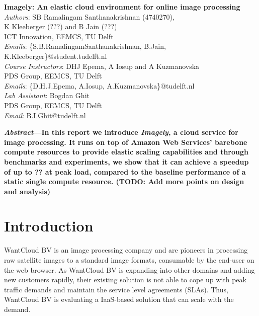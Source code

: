 \documentclass[a4paper]{IEEEtran}
\begin{document}

\begin{center}
  \textbf{\LARGE{
    Imagely: An elastic cloud environment for online image processing
  }}\\
  \vspace{0.25cm}
  \emph{Authors}: SB Ramalingam Santhanakrishnan (4740270), \\ K Kleeberger (???) and B Jain (???)\\
  ICT Innovation, EEMCS, TU Delft\\
  \emph{Emails}: \{S.B.RamalingamSanthanakrishnan, B.Jain, K.Kleeberger\}@student.tudelft.nl\\
  \vspace{0.2cm}
  \emph{Course Instructors}: DHJ Epema, A Iosup and A Kuzmanovska\\
  PDS Group, EEMCS, TU Delft\\
  \emph{Emails}: \{D.H.J.Epema, A.Iosup, A.Kuzmanovska\}@tudelft.nl\\
  \vspace{0.2cm}
  \emph{Lab Assistant}: Bogdan Ghit\\
  PDS Group, EEMCS, TU Delft\\
  \emph{Email}: B.I.Ghit@tudelft.nl\\
\end{center}

\vspace{0.2cm}

\textbf{
  \emph{Abstract}---In this report we introduce \emph{Imagely}, a cloud service for image processing. It runs on top of Amazon Web Services' barebone compute resources to provide elastic scaling capabilities and through benchmarks and experiments, we show that it can achieve a speedup of up to ?? at peak load, compared to the baseline performance of a static single compute resource. (TODO: Add more points on design and analysis)
}

\section{Introduction}

WantCloud BV is an image processing company and are pioneers in processing raw satellite images to a standard image formats, consumable by the end-user on the web browser. As WantCloud BV is expanding into other domains and 
adding new customers rapidly, their existing solution is not able to cope up with peak traffic demands and
 maintain the service level agreements (SLAs). Thus, WantCloud BV is evaluating a IaaS-based solution that
  can scale with the demand.
\end{document}
